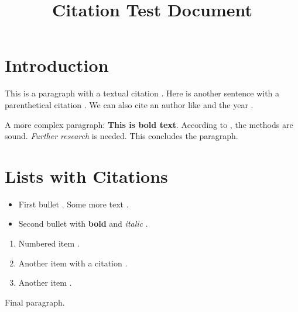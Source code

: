 \title{Citation Test Document}

\section{Introduction}
This is a paragraph with a textual citation \citet[p.~19]{cox_fish_2023}.
Here is another sentence with a parenthetical citation \citep{cox_fish_2023, cox_fish_2023a}.
We can also cite an author like \citeauthor{cox_fish_2023} and the year \citeyearpar[p.~15]{cox_fish_2023}.

A more complex paragraph: \textbf{This is bold text}. According to \citet[Chapter 3]{cox_fish_2023}, the methods are sound. \textit{Further research} \citep[as discussed by][and others]{doe_2022, smith_2021} is needed. This concludes the paragraph.

\section{Lists with Citations}
\begin{itemize}
    \item First bullet \citep{cox_fish_2023}. Some more text \citet[p. 10]{cox_fish_2023}.
    \item Second bullet with \textbf{bold} and \textit{italic} \citeauthor{cox_fish_2023}.
\end{itemize}

\begin{enumerate}
    \item Numbered item \citep[e.g.]{cox_fish_2023}.
    \item Another item with a citation \citep{cox_fish_2023}.
    \item Another item \citeyearpar{cox_fish_2023}.
\end{enumerate}

Final paragraph.
